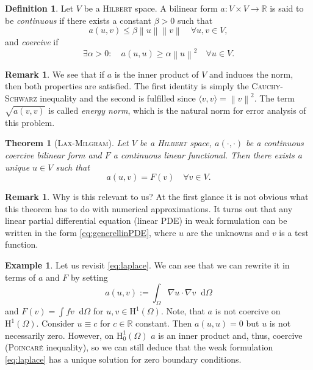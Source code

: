 \documentclass[12pt,a4paper,twoside, open=right]{scrreprt}
\theoremstyle{definition}
\newtheorem{rem}[auf]{Remark}
\newtheorem{defn}[auf]{Definition}
\newtheorem{bsp}[auf]{Example}
\theoremstyle{plain}
\newtheorem{sa}[auf]{Theorem}
\newcommand{\rr}{\mathbb{R}}
\newcommand{\norm}[1]{\left\lVert#1\right\rVert}
\newcommand{\D}{\mathop{}\!\mathrm{d}}
\begin{document}
\begin{defn}
    Let $V$ be a \textsc{Hilbert} space. A bilinear form  $a\colon V\times V\to\rr$ is said to be \emph{continuous} if there exists a constant $\beta>0$ such that
    \begin{equation}
        a(u,v)\le\beta\norm{u}\norm{v}\quad \forall u,v\in V,
    \end{equation}
    and \emph{coercive} if 
    \begin{equation}
        \exists\alpha>0\colon \quad a(u,u)\ge \alpha\norm{u}^2\quad\forall u\in V.
    \end{equation}
\end{defn}
\begin{rem}
    We see that if $a$ is the inner product of $V$ and induces the norm, then both properties are satisfied. The first identity is simply the \textsc{Cauchy-Schwarz} inequality and the second is fulfilled since $\langle v,v\rangle=\norm{v}^2$. The term $\sqrt{a(v,v)}$ is called \emph{energy norm}, which is the natural norm for error analysis of this problem.
\end{rem}
\begin{sa}[\textsc{Lax-Milgram}]
    \label{sa:LaxMilgram}
    Let $V$ be a \textsc{Hilbert} space, $a(\cdot,\cdot)$ be a continuous coercive bilinear form and $F$ a continuous linear functional. Then there exists a unique $u\in V$ such that
    \begin{equation}
        a(u,v)=F(v)\quad \forall v\in V.\label{eq:generellinPDE}
    \end{equation}
\end{sa}
\begin{rem}
    Why is this relevant to us? At the first glance it is not obvious what this theorem has to do with numerical approximations. It turns out that any linear partial differential equation (linear PDE) in weak formulation can be written in the form \eqref{eq:generellinPDE}, where $u$ are the unknowns and $v$ is a test function.
\end{rem}
\begin{bsp}
    Let us revisit \eqref{eq:laplace}. We can see that we can rewrite it in terms of $a$ and $F$ by setting 
    \begin{equation}
        a(u,v):=\int_\Omega \nabla u\cdot \nabla v\D\Omega
    \end{equation}
    and $F(v)=\int fv\D\Omega$ for $u,v\in \mathrm{H}^1(\Omega)$. Note, that $a$ is not coercive on $\mathrm{H}^1(\Omega)$. Consider $u\equiv c$ for $c\in\rr$ constant. Then $a(u,u)=0$ but $u$ is not necessarily zero. However, on $\mathrm{H}^1_0(\Omega)$ $a$ is an inner product and, thus, coercive (\textsc{Poincaré} inequality), so we can still deduce that the weak formulation \eqref{eq:laplace} has a unique solution for zero boundary conditions.
\end{bsp}
\end{document}
